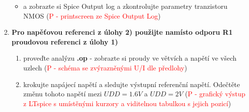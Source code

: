 \begin{enumerate}
\begin{itemize}
        \item a zobrazte si Spice Output log a zkontrolujte parametry tranzistoru NMOS (\textcolor{red}{P - printscreen ze Spice Output Log})
    \end{itemize}
    \item {\bf Pro napěťovou referenci z úlohy 2) použijte namísto odporu R1 proudovou referenci z úlohy 1)}
    \begin{enumerate}
        \item proveďte analýzu {\bf.op} - zobrazte si proudy ve větvích a napětí ve všech uzlech  (\textcolor{red}{P - schéma se zvýrazněnými U/I dle předlohy})
        \item krokujte napájecí napětí a sledujte výstupní referenční napětí. Odečtěte změnu tohoto napětí mezi \(UDD = 1.6 V\) a \(UDD = 2 V\) (\textcolor{red}{P - grafický výstup z LTspice s umístěnými kurzory a viditelnou tabulkou s jejich pozicí})  
    \end{enumerate}
\end{enumerate}
